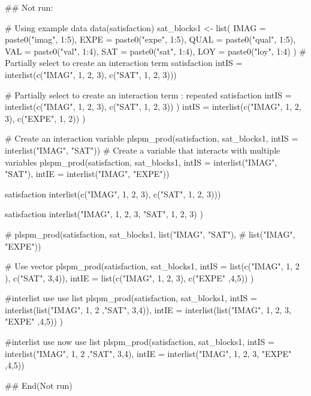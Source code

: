 \documentclass[a4paper]{book}
\begin{document}
\begin{Examples}
\begin{ExampleCode}

## Not run: 

# Using example data
data(satisfaction)
sat_blocks1 <- list(
  IMAG = paste0("imag", 1:5),
  EXPE = paste0("expe", 1:5),
  QUAL = paste0("qual", 1:5),
  VAL = paste0("val", 1:4),
  SAT = paste0("sat", 1:4),
  LOY = paste0("loy", 1:4)
)
# Partially select to create an interaction term
satisfaction%
                           intIS = interlist(c("IMAG", 1, 2, 3), c("SAT", 1, 2, 3))) %

# Partially select to create an interaction term : repeated
satisfaction%
                           intIS = interlist(c("IMAG", 1, 2, 3), c("SAT", 1, 2, 3))
)%
                intIS = interlist(c("IMAG", 1, 2, 3), c("EXPE", 1, 2))
) %


# Create an interaction variable
plspm_prod(satisfaction, sat_blocks1, intIS = interlist("IMAG", "SAT"))    %
# Create a variable that interacts with multiple variables
plspm_prod(satisfaction, sat_blocks1, intIS = interlist("IMAG", "SAT"),
           intIE = interlist("IMAG", "EXPE"))    %

satisfaction%
                           interlist(c("IMAG", 1, 2, 3), c("SAT", 1, 2, 3))) %

satisfaction%
                           interlist("IMAG", 1, 2, 3, "SAT", 1, 2, 3) ) %

# plspm_prod(satisfaction, sat_blocks1, list("IMAG", "SAT"),
#                                        list("IMAG", "EXPE")) %


#  Use vector
plspm_prod(satisfaction, sat_blocks1,
           intIS = list(c("IMAG", 1, 2 ), c("SAT", 3,4)),
           intIE = list(c("IMAG", 1, 2, 3), c("EXPE" ,4,5))
) %

#interlist use use list
plspm_prod(satisfaction,
           sat_blocks1,
           intIS = interlist(list("IMAG", 1, 2 ,"SAT", 3,4)),
           intIE = interlist(list("IMAG", 1, 2, 3, "EXPE" ,4,5)) ) %


#interlist use now use list
plspm_prod(satisfaction,
           sat_blocks1,
           intIS = interlist("IMAG", 1, 2 ,"SAT", 3,4),
           intIE = interlist("IMAG", 1, 2, 3, "EXPE" ,4,5)) %

## End(Not run)



\end{ExampleCode}
\end{Examples}
\end{document}
